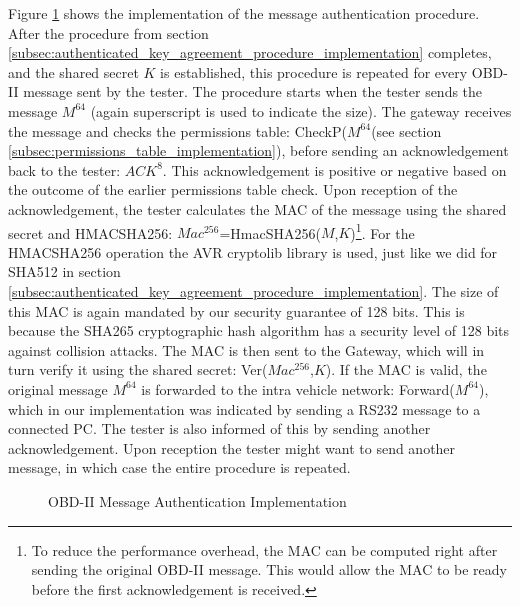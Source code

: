 Figure \ref{fig:message_authentication_implementation} shows the implementation of the message authentication procedure. After the procedure from section \ref{subsec:authenticated_key_agreement_procedure_implementation} completes, and the shared secret $K$ is established, this procedure is repeated for every OBD-II message sent by the tester. The procedure starts when the tester sends the message $M^{64}$ (again superscript is used to indicate the size). The gateway receives the message and checks the permissions table: CheckP($M^{64}$(see section \ref{subsec:permissions_table_implementation}), before sending an acknowledgement back to the tester: $ACK^8$. This acknowledgement is positive or negative based on the outcome of the earlier permissions table check. Upon reception of the acknowledgement, the tester calculates the MAC of the message using the shared secret and HMAC\textunderscore SHA256: $Mac^{256}$=Hmac\textunderscore SHA256($M$,$K$)\footnote{To reduce the performance overhead, the MAC can be computed right after sending the original OBD-II message. This would allow the MAC to be ready before the first acknowledgement is received.}. For the HMAC\textunderscore SHA256 operation the AVR cryptolib library is used, just like we did for SHA512 in section \ref{subsec:authenticated_key_agreement_procedure_implementation}. The size of this MAC is again mandated by our security guarantee of 128 bits. This is because the SHA265 cryptographic hash algorithm has a security level of 128 bits against collision attacks. The MAC is then sent to the Gateway, which will in turn verify it using the shared secret: Ver($Mac^{256}$,$K$). If the MAC is valid, the original message $M^{64}$ is forwarded to the intra vehicle network: Forward($M^{64}$), which in our implementation was indicated by sending a RS232 message to a connected PC. The tester is also informed of this by sending another acknowledgement. Upon reception the tester might want to send another message, in which case the entire procedure is repeated. 

\begin{figure}[h]
	\centering
	\caption{OBD-II Message Authentication Implementation}
	\label{fig:message_authentication_implementation}
\end{figure}

